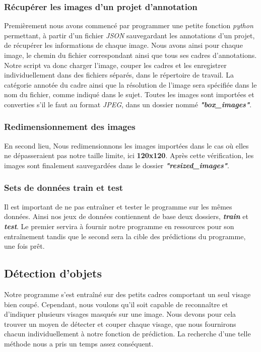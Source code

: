\documentclass{rapport}
\begin{document}
            \subsubsection{Récupérer les images d'un projet d'annotation}
            Premièrement nous avons commencé par programmer une petite fonction \textit{python} permettant, à partir d'un fichier \textit{JSON} sauvegardant les annotations d'un projet, de récupérer les informations de chaque image. Nous avons ainsi pour chaque image, le chemin du fichier correspondant ainsi que tous ses cadres d'annotations. Notre script va donc charger l'image, couper les cadres et les enregistrer individuellement dans des fichiers séparés, dans le répertoire de travail. La catégorie annotée du cadre ainsi que la résolution de l'image sera spécifiée dans le nom du fichier, comme indiqué dans le sujet. Toutes les images sont importées et converties s'il le faut au format \textit{JPEG}, dans un dossier nommé \textit{\textbf{"box\_images"}}.
            
            \subsubsection{Redimensionnement des images}
            En second lieu, Nous redimensionnons les images importées dans le cas où elles ne dépasseraient pas notre taille limite, ici \textbf{120x120}. Après cette vérification, les images sont finalement sauvegardées dans le dossier \textbf{\textit{"resized\_images"}}.
            
            \subsubsection{Sets de données train et test}
            Il est important de ne pas entraîner et tester le programme sur les mêmes données. Ainsi nos jeux de données contiennent de base deux dossiers, \textbf{\textit{train}} et \textbf{\textit{test}}. Le premier servira à fournir notre programme en ressources pour son entraînement tandis que le second sera la cible des prédictions du programme, une fois prêt.
            
        \subsection{Détection d'objets}
            Notre programme s'est entraîné sur des petits cadres comportant un seul visage bien coupé. Cependant, nous voulons qu'il soit capable de reconnaître et d'indiquer plusieurs visages masqués sur une image. Nous devons pour cela trouver un moyen de détecter et couper chaque visage, que nous fournirons chacun individuellement à notre fonction de prédiction. La recherche d'une telle méthode nous a pris un temps assez conséquent.
            
\end{document}
